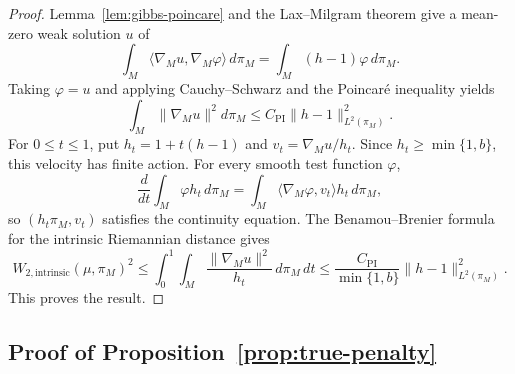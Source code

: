 \documentclass{article}
\numberwithin{equation}{section}
\begin{document}
\begin{proof}
Lemma~\ref{lem:gibbs-poincare} and the Lax--Milgram theorem
\citep[Corollary~5.8]{brezis2011functional} give a mean-zero weak solution
$u$ of
\[
 \int_M\langle\nabla_Mu,\nabla_M\varphi\rangle\,d\pi_M
 =\int_M(h-1)\varphi\,d\pi_M.
\]
Taking $\varphi=u$ and applying Cauchy--Schwarz and the Poincar\'e
inequality yields
\[
 \int_M\|\nabla_Mu\|^2d\pi_M
 \le C_{\mathrm{PI}}\|h-1\|_{L^2(\pi_M)}^2.
\]
For $0\le t\le1$, put
$h_t=1+t(h-1)$ and
$v_t=\nabla_Mu/h_t$.
Since $h_t\ge\min\{1,b\}$, this velocity has finite action.
For every smooth test function $\varphi$,
\[
 \frac{d}{dt}\int_M\varphi h_t\,d\pi_M
 =\int_M\langle\nabla_M\varphi,v_t\rangle h_t\,d\pi_M,
\]
so $(h_t\pi_M,v_t)$ satisfies the continuity equation.
The Benamou--Brenier formula for the intrinsic Riemannian distance gives
\[
 W_{2,\mathrm{intrinsic}}(\mu,\pi_M)^2
 \le\int_0^1\int_M\frac{\|\nabla_Mu\|^2}{h_t}\,d\pi_M\,dt
 \le
 \frac{C_{\mathrm{PI}}}{\min\{1,b\}}
 \|h-1\|_{L^2(\pi_M)}^2.
\]
This proves the result.
\end{proof}



\subsection{Proof of Proposition~\ref{prop:true-penalty}}
\end{document}
